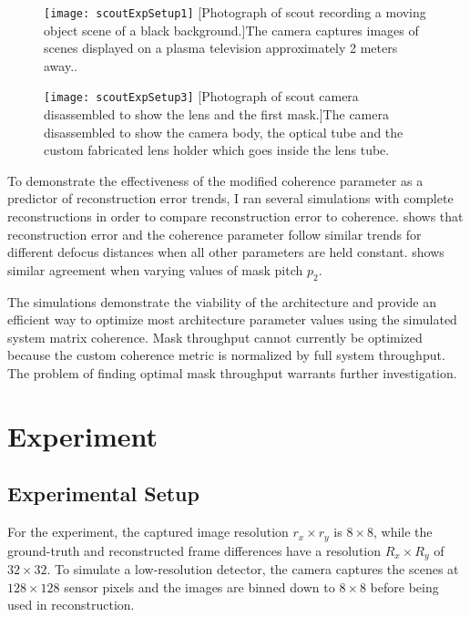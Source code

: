 \begin{figure}[!ht]
	\centering
	\texttt{[image: scoutExpSetup1]}
	[Photograph of \gls{scout} recording a moving object scene of a black background.]{The camera captures images of scenes displayed on a plasma television approximately 2 meters away..}
	\label{fig:scoutExpSetup1}
\end{figure}

\begin{figure}[!ht]
	\centering
	\texttt{[image: scoutExpSetup3]}
	[Photograph of \gls{scout} camera disassembled to show the lens and the first mask.]{The camera disassembled to show the camera body, the optical tube and the custom fabricated lens holder which goes inside the lens tube.}
	\label{fig:scoutExpSetup3}
\end{figure}

To demonstrate the effectiveness of the modified coherence parameter as a predictor of reconstruction error trends, I ran several simulations with complete reconstructions in order to compare reconstruction error to coherence.  shows that reconstruction error and the coherence parameter follow similar trends for different defocus distances when all other parameters are held constant.  shows similar agreement when varying values of mask pitch $p_2$.

The simulations demonstrate the viability of the architecture and provide an efficient way to optimize most architecture parameter values using the simulated system matrix coherence. Mask throughput cannot currently be optimized because the custom coherence metric is normalized by full system throughput. The problem of finding optimal mask throughput warrants further investigation.

\section{Experiment}\label{sec:ScoutExperimentalResults}

\subsection{Experimental Setup}

For the experiment, the captured image resolution $r_x \times r_y$ is $8 \times 8$, while the ground-truth and reconstructed frame differences have a resolution $R_x \times R_y$ of $32 \times 32$. To simulate a low-resolution detector, the camera captures the scenes at $128 \times 128$ sensor pixels and the images are binned down to $8 \times 8$ before being used in reconstruction. 


